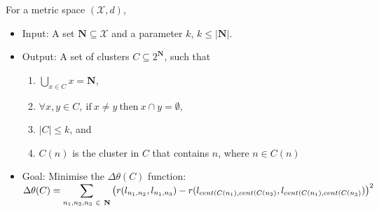 For a metric space $(\mathcal{X}, d)$,
\begin{itemize}
    \item Input: A set $\textbf{N} \subseteq \mathcal{X}$ and a parameter $k$, $k \leq |\textbf{N}|$.
    \item Output: A set of clusters $C \subseteq 2^{\textbf{N}}$, such that
          \begin{enumerate}
              \item $\bigcup\limits_{x \in C}x = \textbf{N}$,
              \item $\forall x, y \in C, \ \text{if} \ x \neq y \ \text{then} \ x \cap y = \emptyset$,
              \item $|C| \leq k$, and
              \item $C(n)$ is the cluster in $C$ that contains $n$, where $n \in C(n)$
          \end{enumerate}
    \item Goal: Minimise the $\Delta\theta(C)$ function:\smallbreak $\Delta\theta(C) = \mathlarger{\sum}\limits_{n_1, n_2, n_3 \ \in \ \textbf{N}} \left( r(l_{n_1,n_2}, l_{n_1,n_3}) - r(l_{cent(C(n_1),cent(C(n_2)}, l_{cent(C(n_1),cent(C(n_3)}) \right)^2$



\end{itemize}

